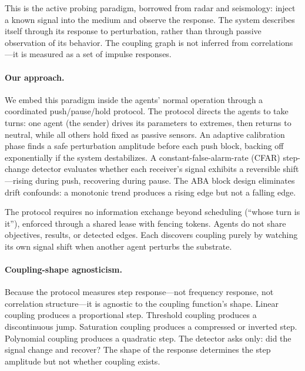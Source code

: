 This is the active probing paradigm, borrowed from radar and
seismology: inject a known signal into the medium and observe the
response. The system describes itself through its response to
perturbation, rather than through passive observation of its
behavior. The coupling graph is not inferred from correlations---it
is measured as a set of impulse responses.

\paragraph{Our approach.}
We embed this paradigm inside the agents' normal operation through a
coordinated push/pause/hold protocol. The protocol directs the agents
to take turns: one agent (the sender) drives its parameters to
extremes, then returns to neutral, while all others hold fixed as
passive sensors. An adaptive calibration phase finds a safe
perturbation amplitude before each push block, backing off
exponentially if the system destabilizes. A constant-false-alarm-rate
(CFAR) step-change detector evaluates whether each receiver's signal
exhibits a reversible shift---rising during push, recovering during
pause. The ABA block design eliminates drift confounds: a monotonic
trend produces a rising edge but not a falling edge.

The protocol requires no information exchange beyond scheduling
(``whose turn is it''), enforced through a shared lease with fencing
tokens. Agents do not share objectives, results, or detected edges.
Each discovers coupling purely by watching its own signal shift when
another agent perturbs the substrate.

\paragraph{Coupling-shape agnosticism.}
Because the protocol measures step response---not frequency response,
not correlation structure---it is agnostic to the coupling function's
shape. Linear coupling produces a proportional step. Threshold
coupling produces a discontinuous jump. Saturation coupling produces
a compressed or inverted step. Polynomial coupling produces a
quadratic step. The detector asks only: did the signal change and
recover? The shape of the response determines the step amplitude but
not whether coupling exists.

